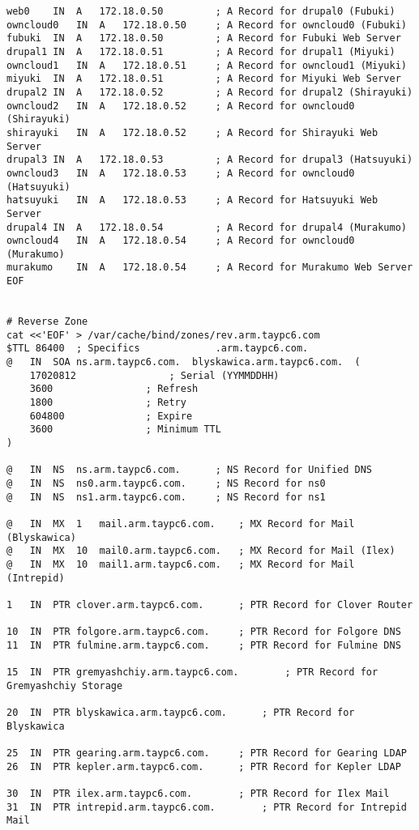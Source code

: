 \documentclass[12pt]{spieman}  %
\begin{document}
\begin{lstlisting}
web0	IN	A	172.18.0.50			; A Record for drupal0 (Fubuki)
owncloud0	IN	A	172.18.0.50		; A Record for owncloud0 (Fubuki)
fubuki	IN	A	172.18.0.50			; A Record for Fubuki Web Server
drupal1	IN	A	172.18.0.51			; A Record for drupal1 (Miyuki)
owncloud1	IN	A	172.18.0.51		; A Record for owncloud1 (Miyuki)
miyuki	IN	A	172.18.0.51			; A Record for Miyuki Web Server
drupal2	IN	A	172.18.0.52			; A Record for drupal2 (Shirayuki)
owncloud2	IN	A	172.18.0.52		; A Record for owncloud0 (Shirayuki)
shirayuki	IN	A	172.18.0.52		; A Record for Shirayuki Web Server
drupal3	IN	A	172.18.0.53			; A Record for drupal3 (Hatsuyuki)
owncloud3	IN	A	172.18.0.53		; A Record for owncloud0 (Hatsuyuki)
hatsuyuki	IN	A	172.18.0.53		; A Record for Hatsuyuki Web Server
drupal4	IN	A	172.18.0.54			; A Record for drupal4 (Murakumo)
owncloud4	IN	A	172.18.0.54		; A Record for owncloud0 (Murakumo)
murakumo	IN	A	172.18.0.54		; A Record for Murakumo Web Server
EOF


# Reverse Zone
cat <<'EOF' > /var/cache/bind/zones/rev.arm.taypc6.com
$TTL 86400	; Specifics				.arm.taypc6.com.
@	IN	SOA	ns.arm.taypc6.com.	blyskawica.arm.taypc6.com.	(
	17020812				; Serial (YYMMDDHH)
	3600				; Refresh
	1800				; Retry
	604800				; Expire
	3600				; Minimum TTL
)					
					
@	IN	NS	ns.arm.taypc6.com.		; NS Record for Unified DNS
@	IN	NS	ns0.arm.taypc6.com.		; NS Record for ns0
@	IN	NS	ns1.arm.taypc6.com.		; NS Record for ns1
					
@	IN	MX	1	mail.arm.taypc6.com.	; MX Record for Mail (Blyskawica)
@	IN	MX	10	mail0.arm.taypc6.com.	; MX Record for Mail (Ilex)
@	IN	MX	10	mail1.arm.taypc6.com.	; MX Record for Mail (Intrepid)
					
1	IN	PTR	clover.arm.taypc6.com.		; PTR Record for Clover Router
					
10	IN	PTR	folgore.arm.taypc6.com.		; PTR Record for Folgore DNS
11	IN	PTR	fulmine.arm.taypc6.com.		; PTR Record for Fulmine DNS
					
15	IN	PTR	gremyashchiy.arm.taypc6.com.		; PTR Record for Gremyashchiy Storage
					
20	IN	PTR	blyskawica.arm.taypc6.com.		; PTR Record for Blyskawica
					
25	IN	PTR	gearing.arm.taypc6.com.		; PTR Record for Gearing LDAP 
26	IN	PTR	kepler.arm.taypc6.com.		; PTR Record for Kepler LDAP
					
30	IN	PTR	ilex.arm.taypc6.com.		; PTR Record for Ilex Mail
31	IN	PTR	intrepid.arm.taypc6.com.		; PTR Record for Intrepid Mail
					

\end{lstlisting}
\end{document}
